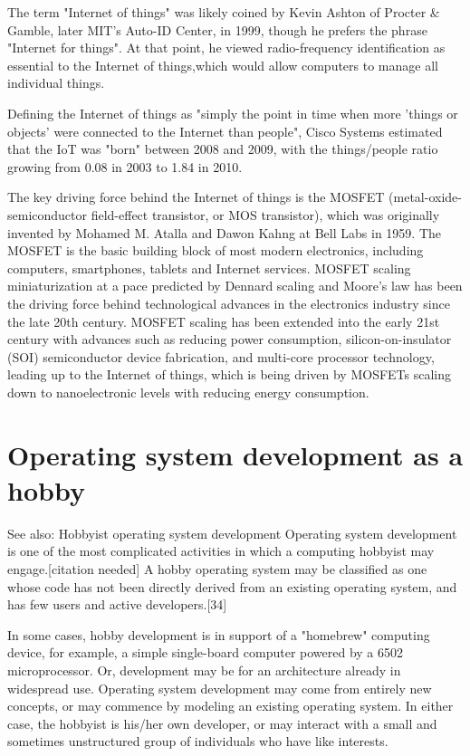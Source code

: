 \documentclass[oneside, 11 pt]{report}
\begin{document}
The term "Internet of things" was likely coined by Kevin Ashton of Procter & Gamble, later MIT's Auto-ID Center, in 1999, though he prefers the phrase "Internet for things". At that point, he viewed radio-frequency identification  as essential to the Internet of things,which would allow computers to manage all individual things.

Defining the Internet of things as "simply the point in time when more 'things or objects' were connected to the Internet than people", Cisco Systems estimated that the IoT was "born" between 2008 and 2009, with the things/people ratio growing from 0.08 in 2003 to 1.84 in 2010.

The key driving force behind the Internet of things is the MOSFET (metal-oxide-semiconductor field-effect transistor, or MOS transistor), which was originally invented by Mohamed M. Atalla and Dawon Kahng at Bell Labs in 1959. The MOSFET is the basic building block of most modern electronics, including computers, smartphones, tablets and Internet services. MOSFET scaling miniaturization at a pace predicted by Dennard scaling and Moore's law has been the driving force behind technological advances in the electronics industry since the late 20th century. MOSFET scaling has been extended into the early 21st century with advances such as reducing power consumption, silicon-on-insulator (SOI) semiconductor device fabrication, and multi-core processor technology, leading up to the Internet of things, which is being driven by MOSFETs scaling down to nanoelectronic levels with reducing energy consumption.
\section{Operating system development as a hobby}
See also: Hobbyist operating system development
Operating system development is one of the most complicated activities in which a computing hobbyist may engage.[citation needed] A hobby operating system may be classified as one whose code has not been directly derived from an existing operating system, and has few users and active developers.[34]

In some cases, hobby development is in support of a "homebrew" computing device, for example, a simple single-board computer powered by a 6502 microprocessor. Or, development may be for an architecture already in widespread use. Operating system development may come from entirely new concepts, or may commence by modeling an existing operating system. In either case, the hobbyist is his/her own developer, or may interact with a small and sometimes unstructured group of individuals who have like interests.
\end{document}
